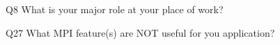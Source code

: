 \begin{description}%
\item{Q8} What is your major role at your place of work?%
\item{Q27} What MPI feature(s) are NOT useful for you application?%
\end{description}%
